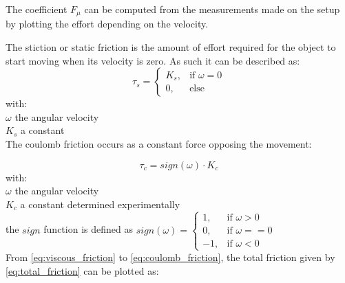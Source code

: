 The coefficient $F_\mu$ can be computed from the measurements made on the setup by plotting the effort depending on the velocity.

The stiction or static friction is the amount of effort required for the object to start moving when its velocity is zero. As such it can be described as:
\vspace{9pt}
\begin{equation} 
\tau_s =  \begin{cases} K_s, & \mbox{if } \omega = 0 \\ 0, & \mbox{else} \end{cases}
\label{eq:static_friction}
\end{equation}
with:\\
\hspace*{8mm}$\omega$ the angular velocity\\
\hspace*{8mm}$K_s$ a constant\\

The coulomb friction occurs as a constant force opposing the movement:

\begin{equation}
\tau_c = sign(\omega)\cdot K_c
\label{eq:coulomb_friction}
\end{equation}
with:\\
\hspace*{8mm}$\omega$ the angular velocity\\
\hspace*{8mm}$K_c$ a constant determined experimentally\\
\hspace*{8mm}the $sign$ function is defined as $sign(\omega) = \begin{cases} 1, & \mbox{if } \omega > 0 \\ 0, & \mbox{if } \omega == 0 \\ -1, & \mbox{if } \omega < 0\end{cases}$\\

From \eqref{eq:viscous_friction} to \eqref{eq:coulomb_friction}, the total friction given by \eqref{eq:total_friction} can be plotted as:

